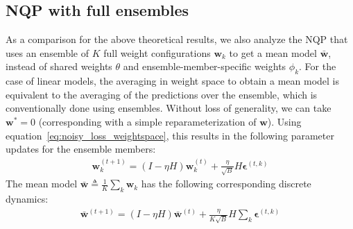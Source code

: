 \documentclass{article} \usepackage{iclr2021_conference,times}
\def\eqref#1{equation~\ref{#1}}
\begin{document}
\subsection{NQP with full ensembles}\label{sec:NQP_full_ensembles}
As a comparison for the above theoretical results, we also analyze the NQP that uses an ensemble of $K$ full weight configurations $\mathbf{w}_k$ to get a mean model $\bar{\mathbf{w}}$, instead of shared weights $\theta$ and ensemble-member-specific weights $\phi_k$. For the case of linear models, the averaging in weight space to obtain a mean model is equivalent to the averaging of the predictions over the ensemble, which is conventionally done using ensembles. Without loss of generality, we can take $\mathbf{w}^*=0$ (corresponding with a simple reparameterization of $\mathbf{w}$). Using \eqref{eq:noisy_loss_weightspace}, this results in the following parameter updates for the ensemble members:
\begin{align}
    \mathbf{w}_k^{(t+1)} = (I - \eta H) \mathbf{w}_k^{(t)} + \frac{\eta}{\sqrt{B}}H\boldsymbol{\epsilon}^{(t,k)}
\end{align}
The mean model $\bar{\mathbf{w}} \triangleq \frac{1}{K}\sum_k \mathbf{w}_k $ has the following corresponding discrete dynamics: 
\begin{align}\label{eq:full_ensemble_updates}
    \bar{\mathbf{w}}^{(t+1)} = (I - \eta H) \bar{\mathbf{w}}^{(t)} + \frac{\eta}{K\sqrt{B}}H\sum_k \boldsymbol{\epsilon}^{(t,k)}
\end{align}
\end{document}
